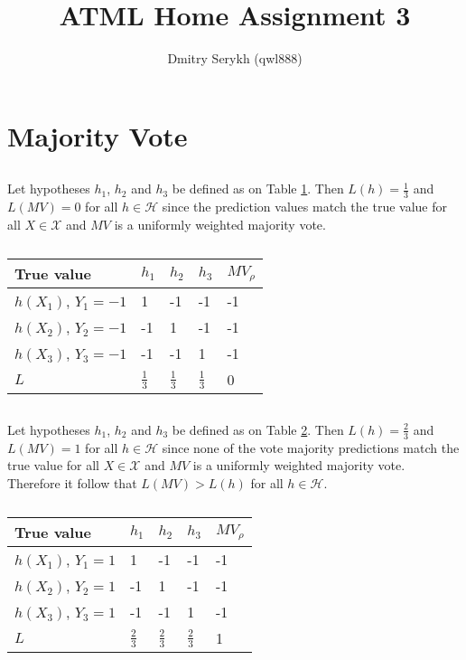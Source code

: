 \documentclass[a4paper]{article}
\title{\vspace{-5cm}ATML Home Assignment 3}
\author{Dmitry Serykh (qwl888)}
\begin{document}
\maketitle
\section{Majority Vote}
\label{sec:1}
\subsection{}
\label{subsec:11}
Let hypotheses $h_1$, $h_2$ and $h_3$ be defined as on Table \ref{tab:1}. Then
$L(h)=\frac{1}{3}$ and $L(MV) = 0$ for all $h \in \mathcal{H}$  since the
prediction values match the true value for all $X \in \mathcal{X}$ and
$MV$ is a uniformly weighted majority vote.\\

\begin{table}[H]
\centering
\begin{tabular}{|l|l|l|l|l|}
\hline
True value & $h_1$ & $h_2$ & $h_3$ & $MV_{\rho}$ \\ \hline
$h(X_1)$, $Y_1=-1$ & 1 & -1 & -1 & -1 \\ \hline
$h(X_2)$, $Y_2=-1$ & -1 & 1 & -1 & -1 \\ \hline
$h(X_3)$, $Y_3=-1$ & -1 & -1 & 1 & -1 \\ \hline
$L$ & $\frac{1}{3}$ & $\frac{1}{3}$ & $\frac{1}{3}$ & 0 \\ \hline
\end{tabular}
\caption{}
\label{tab:1}
\end{table}

\subsection{}
\label{subsec:22}
Let hypotheses $h_1$, $h_2$ and $h_3$ be defined as on Table \ref{tab:2}. Then
$L(h)=\frac{2}{3}$ and $L(MV) = 1$ for all $h \in \mathcal{H}$  since none of the
vote majority predictions match the true value for all $X \in \mathcal{X}$ and
$MV$ is a uniformly weighted majority vote.\\
Therefore it follow that $L(MV) > L(h)$ for all $h\in \mathcal{H}$.
\begin{table}[H]
\centering
\begin{tabular}{|l|l|l|l|l|}
\hline
True value & $h_1$ & $h_2$ & $h_3$ & $MV_{\rho}$ \\ \hline
$h(X_1)$, $Y_1=1$ & 1 & -1 & -1 & -1 \\ \hline
$h(X_2)$, $Y_2=1$ & -1 & 1 & -1 & -1 \\ \hline
$h(X_3)$, $Y_3=1$ & -1 & -1 & 1 & -1 \\ \hline
$L$ & $\frac{2}{3}$ & $\frac{2}{3}$ & $\frac{2}{3}$ & 1 \\ \hline
\end{tabular}
\caption{}
\label{tab:2}
\end{table}
\end{document}

